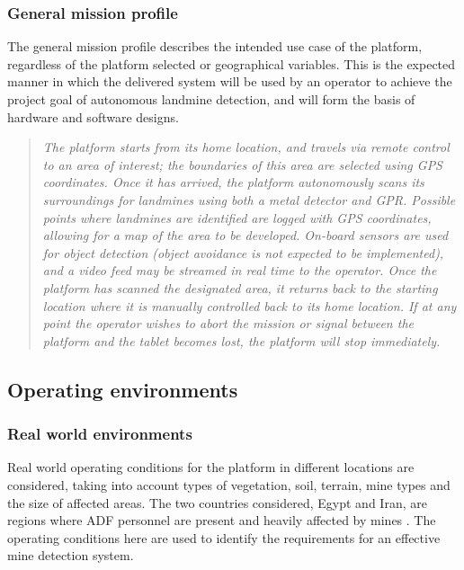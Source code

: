 \documentclass[main.tex]{subfiles}
\begin{document}
\subsubsection{General mission profile}
The general mission profile describes the intended use case of the platform, regardless of the platform selected or geographical variables. This is the expected manner in which the delivered system will be used by an operator to achieve the project goal of autonomous landmine detection, and will form the basis of hardware and software designs.
\begin{quote}\textit{The platform starts from its home location, and travels via remote control to an area of interest; the boundaries of this area are selected using GPS coordinates. Once it has arrived, the platform autonomously scans its surroundings for landmines using both a metal detector and GPR. Possible points where landmines are identified are logged with GPS coordinates, allowing for a map of the area to be developed. On-board sensors are used for object detection (object avoidance is not expected to be implemented), and a video feed may be streamed in real time to the operator. Once the platform has scanned the designated area, it returns back to the starting location where it is manually controlled back to its home location. If at any point the operator wishes to abort the mission or signal between the platform and the tablet becomes lost, the platform will stop immediately.}
\end{quote}
\subsection{Operating environments}
\subsubsection{Real world environments}

Real world operating conditions for the platform in different locations are considered, taking into account types of vegetation, soil, terrain, mine types and the size of affected areas. The two countries considered, Egypt and Iran, are regions where ADF personnel are present and heavily affected by mines \parencite{AustralianGovernment2016}. The operating conditions here are used to identify the requirements for an effective mine detection system.

\end{document}
